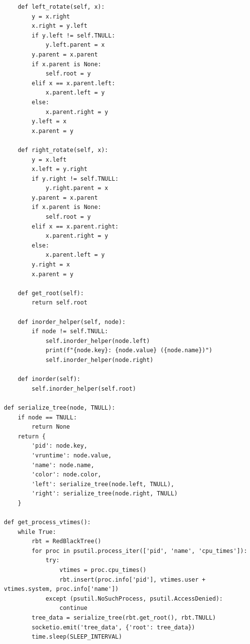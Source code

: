 \documentclass[12pt]{article}
\begin{document}
\begin{verbatim}
    def left_rotate(self, x):
        y = x.right
        x.right = y.left
        if y.left != self.TNULL:
            y.left.parent = x
        y.parent = x.parent
        if x.parent is None:
            self.root = y
        elif x == x.parent.left:
            x.parent.left = y
        else:
            x.parent.right = y
        y.left = x
        x.parent = y

    def right_rotate(self, x):
        y = x.left
        x.left = y.right
        if y.right != self.TNULL:
            y.right.parent = x
        y.parent = x.parent
        if x.parent is None:
            self.root = y
        elif x == x.parent.right:
            x.parent.right = y
        else:
            x.parent.left = y
        y.right = x
        x.parent = y

    def get_root(self):
        return self.root

    def inorder_helper(self, node):
        if node != self.TNULL:
            self.inorder_helper(node.left)
            print(f"{node.key}: {node.value} ({node.name})")
            self.inorder_helper(node.right)

    def inorder(self):
        self.inorder_helper(self.root)

def serialize_tree(node, TNULL):
    if node == TNULL:
        return None
    return {
        'pid': node.key,
        'vruntime': node.value,
        'name': node.name,
        'color': node.color,
        'left': serialize_tree(node.left, TNULL),
        'right': serialize_tree(node.right, TNULL)
    }

def get_process_vtimes():
    while True:
        rbt = RedBlackTree()
        for proc in psutil.process_iter(['pid', 'name', 'cpu_times']):
            try:
                vtimes = proc.cpu_times()
                rbt.insert(proc.info['pid'], vtimes.user + vtimes.system, proc.info['name'])
            except (psutil.NoSuchProcess, psutil.AccessDenied):
                continue
        tree_data = serialize_tree(rbt.get_root(), rbt.TNULL)
        socketio.emit('tree_data', {'root': tree_data})
        time.sleep(SLEEP_INTERVAL)

\end{verbatim}
\end{document}
